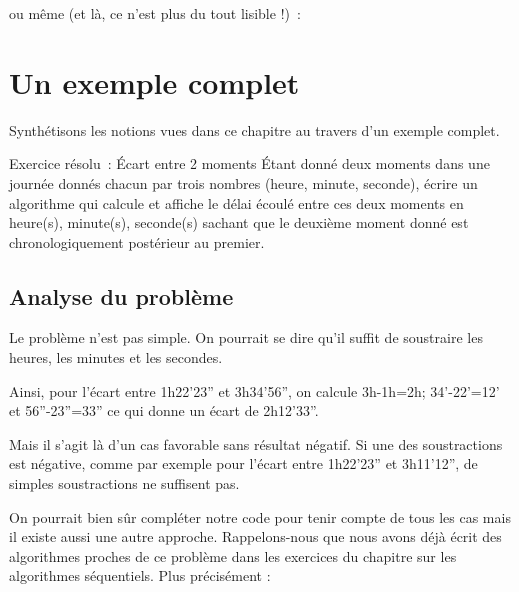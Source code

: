 	ou même (et là, ce n'est plus du tout lisible !)~:


\section{Un exemple complet}

Synthétisons les notions vues dans ce chapitre au travers
d'un exemple complet.


\begin{Emphase}[exercice]{Exercice résolu~: Écart entre 2 moments}
	Étant donné deux moments dans une journée donnés chacun par trois
	nombres (heure, minute, seconde), écrire un algorithme qui calcule et
	affiche le délai écoulé entre ces deux moments en heure(s), minute(s),
	seconde(s) sachant que le deuxième moment donné est chronologiquement
	postérieur au premier.
\end{Emphase}

\subsection*{Analyse du problème}

	Le problème n'est pas simple. 
	On pourrait se dire qu'il suffit de soustraire les heures, 
	les minutes et les secondes.

	Ainsi, pour l'écart entre
	1h22'23'' et
	3h34'56'', on
	calcule 3h-1h=2h;
	34'-22'=12' et
	56''-23''=33''
	ce qui donne un écart de
	2h12'33''.

	Mais il s'agit là d'un cas favorable
	sans résultat négatif. Si une des soustractions est négative, comme par
	exemple pour l'écart entre
	1h22'23'' et
	3h11'12'', de
	simples soustractions ne suffisent pas.

	On pourrait bien sûr compléter notre code pour tenir compte de tous les
	cas mais il existe aussi une autre approche. Rappelons-nous que nous
	avons déjà écrit des algorithmes proches de ce problème dans les
	exercices du chapitre sur les algorithmes séquentiels. Plus précisément
	:



